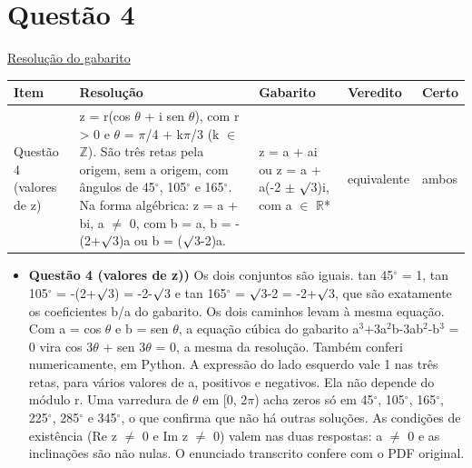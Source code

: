 \documentclass{article}%
\begin{document}
\section*{Questão 4}%
\href{https://poliedroresolve.sistemapoliedro.com.br/vestibulares/ime/2026/ime-2-fase-dia-1-23-10-2025-2-fase-dia-1/dissertativa-4-matematica-2-fase-dia-1-ime-2026}{Resolução do gabarito}\par\smallskip%
\begin{longtable}{@{}p{} p{} p{} p{} p{}@{}}\toprule Item & Resolução & Gabarito & Veredito & Certo \\ \midrule
Questão 4 (valores de z) & z = r(cos $\theta$ + i sen $\theta$), com r > 0 e $\theta$ = $\pi$/4 + k$\pi$/3 (k $\in$ $\mathbb{Z}$). São três retas pela origem, sem a origem, com ângulos de 45$^\circ$, 105$^\circ$ e 165$^\circ$. Na forma algébrica: z = a + bi, a $\neq$ 0, com b = a, b = -(2+$\surd$3)a ou b = ($\surd$3-2)a. & z = a + ai ou z = a + a(-2 $\pm$ $\surd$3)i, com a $\in$ $\mathbb{R}$* & equivalente & ambos \\
\bottomrule\end{longtable}%
\begin{itemize}%
\item%
\textbf{Questão 4 (valores de z))} Os dois conjuntos são iguais. tan 45$^\circ$ = 1, tan 105$^\circ$ = -(2+$\surd$3) = -2-$\surd$3 e tan 165$^\circ$ = $\surd$3-2 = -2+$\surd$3, que são exatamente os coeficientes b/a do gabarito. Os dois caminhos levam à mesma equação. Com a = cos $\theta$ e b = sen $\theta$, a equação cúbica do gabarito a$^3$+3a$^2$b-3ab$^2$-b$^3$ = 0 vira cos 3$\theta$ + sen 3$\theta$ = 0, a mesma da resolução. Também conferi numericamente, em Python. A expressão do lado esquerdo vale 1 nas três retas, para vários valores de a, positivos e negativos. Ela não depende do módulo r. Uma varredura de $\theta$ em {[}0, 2$\pi$) acha zeros só em 45$^\circ$, 105$^\circ$, 165$^\circ$, 225$^\circ$, 285$^\circ$ e 345$^\circ$, o que confirma que não há outras soluções. As condições de existência (Re z $\neq$ 0 e Im z $\neq$ 0) valem nas duas respostas: a $\neq$ 0 e as inclinações são não nulas. O enunciado transcrito confere com o PDF original.%
\end{itemize}%
\end{document}
